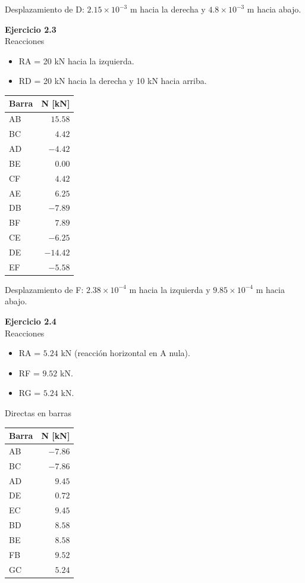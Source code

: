 Desplazamiento de D: $ 2.15 \times 10^{-3}$ m hacia la derecha y $4.8 \times 10^{-3}$ m hacia abajo.\newline

\textbf{Ejercicio 2.3}\\

Reacciones
\begin{itemize}
\item RA = 20 kN hacia la izquierda.
\item RD = 20 kN hacia la derecha y 10 kN hacia arriba.
\end{itemize}

\begin{center}
	\begin{tabular}{lr}
		\hline
		Barra & N [kN] \\
		\hline
AB & $15.58$ \\
BC & $4.42$ \\
AD & $-4.42$ \\
BE & $0.00$ \\
CF & $4.42$ \\
AE & $6.25$ \\
DB & $-7.89$ \\
BF & $7.89$ \\
CE & $-6.25$ \\
DE & $-14.42$ \\
EF & $-5.58$ \\
\hline
\end{tabular}
\end{center}

Desplazamiento de F: $2.38 \times 10^{-4}$ m hacia la izquierda y $9.85 \times 10^{-4}$ m hacia abajo.\newline


\textbf{Ejercicio 2.4}\\


Reacciones
\begin{itemize}
\item RA = $5.24$ kN (reacción horizontal en A nula).
\item RF = $9.52$ kN.
\item RG = $5.24$ kN.
\end{itemize}

Directas en barras

\begin{center}
	\begin{tabular}{lr}
		\hline
		Barra & N [kN] \\
		\hline
AB & $-7.86$ \\
BC & $-7.86$ \\
AD & $9.45$ \\
DE & $0.72$ \\
EC & $9.45$ \\
BD & $8.58$ \\
BE & $8.58$ \\
FB & $9.52$ \\
GC & $5.24$ \\
\hline
\end{tabular}
\end{center}

